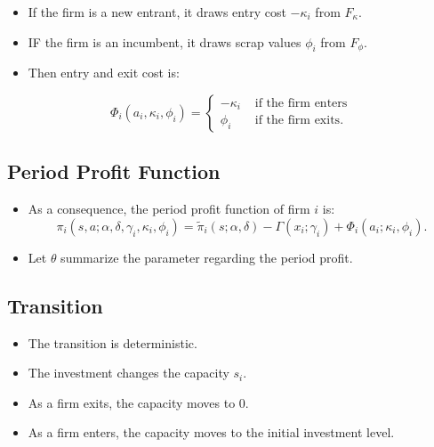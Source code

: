\documentclass[
]{book}
\providecommand{\tightlist}{%
  \setlength{\itemsep}{0pt}\setlength{\parskip}{0pt}}
\begin{document}
\begin{itemize}
\tightlist
\item
  If the firm is a new entrant, it draws entry cost \(-\kappa_i\) from \(F_\kappa\).
\item
  IF the firm is an incumbent, it draws scrap values \(\phi_i\) from \(F_\phi\).
\item
  Then entry and exit cost is:
\end{itemize}

\begin{equation}
\Phi_i(a_i, \kappa_i, \phi_i) =
\begin{cases}
- \kappa_i &\text{   if the firm enters}\\
\phi_i &\text{   if the firm exits}.
\end{cases}
\end{equation}

\hypertarget{period-profit-function}{%
\subsection{Period Profit Function}\label{period-profit-function}}

\begin{itemize}
\tightlist
\item
  As a consequence, the period profit function of firm \(i\) is:
  \begin{equation}
  \pi_i(s, a; \alpha, \delta, \gamma_i, \kappa_i, \phi_i) = \tilde{\pi}_i(s; \alpha, \delta) - \Gamma(x_i; \gamma_i) + \Phi_i(a_i; \kappa_i, \phi_i).
  \end{equation}
\item
  Let \(\theta\) summarize the parameter regarding the period profit.
\end{itemize}

\hypertarget{transition}{%
\subsection{Transition}\label{transition}}

\begin{itemize}
\tightlist
\item
  The transition is deterministic.
\item
  The investment changes the capacity \(s_i\).
\item
  As a firm exits, the capacity moves to 0.
\item
  As a firm enters, the capacity moves to the initial investment level.
\end{itemize}
\end{document}

